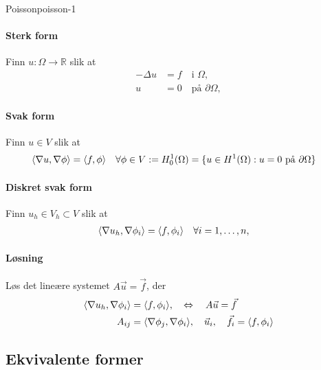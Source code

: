 \documentclass[../main.tex]{subfiles}
\begin{document}
\begin{example}{Poisson}{poisson-1}
    \paragraph{Sterk form}
    Finn $u: \Omega \to \mathbb{R}$ slik at
    \begin{align*}
        -\Delta u & = f \quad \text{i } \Omega,          \\
        u         & = 0 \quad \text{på } \partial\Omega,
    \end{align*}

    \paragraph{Svak form}
    Finn $u \in V$ slik at
    \begin{align*}
        \inner*{\nabla u, \nabla \phi} & = \inner*{f, \phi} \quad \forall \phi \in V := H^1_0(\Omega) = \{ u \in H^1(\Omega) : u = 0 \text{ på } \partial\Omega \}
    \end{align*}

    \paragraph{Diskret svak form}
    Finn $u_h \in V_h \subset V$ slik at
    \begin{align*}
        \inner*{\nabla u_h, \nabla \phi_i} & = \inner*{f, \phi_i} \quad \forall i = 1, \ldots, n,
    \end{align*}

    \paragraph{Løsning}
    Løs det lineære systemet $A\vec{u} = \vec{f}$, der
    \begin{align*}
        \inner*{\nabla u_h, \nabla \phi_i} & = \inner*{f, \phi_i},  \quad \Leftrightarrow \quad A\vec{u} = \vec{f}                          \\
        A_{ij}                             & = \inner*{\nabla \phi_j, \nabla \phi_i}, \quad \vec{u}_i, \quad \vec{f}_i = \inner*{f, \phi_i} \\
    \end{align*}

\end{example}

\subsection{Ekvivalente former}
\end{document}

